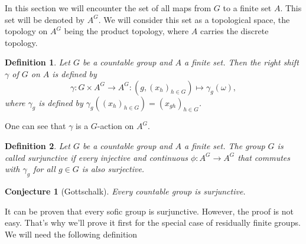 \documentclass[titlepage, a4paper]{article}
\newtheorem{definition}{Definition}
\newtheorem{conjecture}{Conjecture}
\theoremstyle{remark}
\begin{document}
    In this section we will encounter the set of all maps from $G$ to a finite set $A$. This set will be denoted by $A^G$. We will consider this set as a topological space, the topology on $A^G$ being the product topology, where $A$ carries the discrete topology.

    \begin{definition}
        Let $G$ be a countable group and $A$ a finite set. Then the right shift $\gamma$ of $G$ on $A$ is defined by
        \[
        \gamma: G \times A^G \to A^G: \left(g, (x_{h})_{h \in G} \right) \mapsto \gamma_g(\omega),
        \]
        where $\gamma_g$ is defined by $\gamma_g\left( (x_{h})_{h \in G} \right) = \left( x_{gh} \right)_{h \in G}$. %
    \end{definition}

    One can see that $\gamma$ is a $G$-action on $A^G$.
    \begin{definition}
        Let $G$ be a countable group and $A$ a finite set. The group $G$ is called surjunctive if every injective and continuous $\phi: A^{G}\to A^{G}$ that commutes with $\gamma_g$ for all $g \in G$ is also surjective.
    \end{definition}

    \begin{conjecture}[Gottschalk] \label{conj:gottschalk}
        Every countable group is surjunctive.
    \end{conjecture}

    It can be proven that every sofic group is surjunctive. However, the proof is not easy. That's why we'll prove it first for the special case of residually finite groups. We will need the following definition
\end{document}
